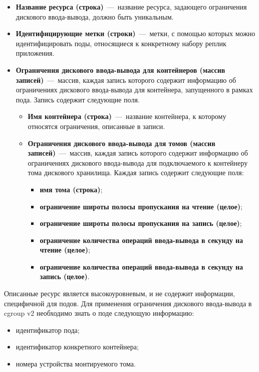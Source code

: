 \begin{itemize}
	\item \textbf{Название ресурса (строка)}~---~название ресурса, задающего ограничения дискового ввода-вывода, должно быть уникальным.
	\item \textbf{Идентифицирующие метки (строки)}~---~метки, с помощью которых можно идентифицировать поды, относящиеся к конкретному набору реплик приложения.
	\item \textbf{Ограничения дискового ввода-вывода для контейнеров (массив записей)}~---~массив, каждая запись которого содержит информацию об ограничениях дискового ввода-вывода для контейнера, запущенного в рамках пода. Запись содержит следующие поля.
	\begin{itemize}
		\item \textbf{Имя контейнера (строка)}~---~название контейнера, к которому относятся ограничения, описанные в записи.
		\item \textbf{Ограничения дискового ввода-вывода для томов (массив записей)}~---~массив, каждая запись которого содержит информацию об ограничениях дискового ввода-вывода для подключаемого к контейнеру тома дискового хранилища. Каждая запись содержит следующие поля:
		
		\begin{itemize}
		\item \textbf{имя тома (строка)};
		\item \textbf{ограничение широты полосы пропускания на чтение (целое)};
		\item \textbf{ограничение широты полосы пропускания на запись (целое)};
		\item \textbf{ограничение количества операций ввода-вывода в секунду на чтение (целое)};
		\item \textbf{ограничение количества операций ввода-вывода в секунду на запись (целое)}.
		\end{itemize}
	\end{itemize}
\end{itemize}

Описанные ресурс является высокоуровневым, и не содержит информации, специфичной для подов. Для применения ограничения дискового ввода-вывода в cgroup v2 необходимо знать о поде следующую информацию:

\begin{itemize}
	\item идентификатор пода;
	\item идентификатор конкретного контейнера;
	\item номера устройства монтируемого тома.
\end{itemize}

